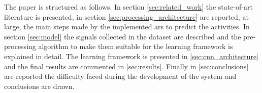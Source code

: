 The paper is structured as follows. In section \ref{sec:related_work} the state-of-art literature is presented, in section \ref{sec:processing_architecture} are reported, at large, the main steps made by the implemented \gls{ars} to predict the activities.
In section \ref{sec:model} the signals collected in the dataset are described and the pre-processing algorithm to make them suitable for the learning framework is explained in detail.
The learning framework is presented in \ref{sec:cnn_architecture} and the final results are commented in \ref{sec:results}.
Finally in \ref{sec:conclusions} are reported the difficulty faced during the development of the system and conclusions are drawn.